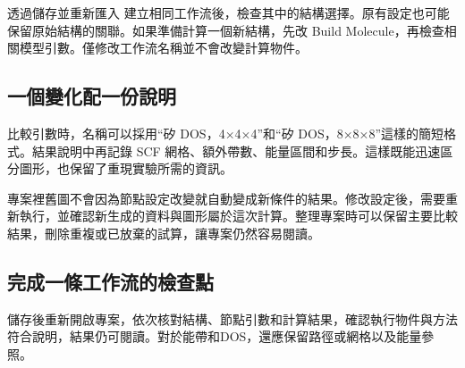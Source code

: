 透過儲存並重新匯入  建立相同工作流後，檢查其中的結構選擇。原有設定也可能保留原始結構的關聯。如果準備計算一個新結構，先改 Build Molecule，再檢查相關模型引數。僅修改工作流名稱並不會改變計算物件。

\subsection{一個變化配一份說明}

比較引數時，名稱可以採用“矽 DOS，4×4×4”和“矽 DOS，8×8×8”這樣的簡短格式。結果說明中再記錄 SCF 網格、額外帶數、能量區間和步長。這樣既能迅速區分圖形，也保留了重現實驗所需的資訊。

專案裡舊圖不會因為節點設定改變就自動變成新條件的結果。修改設定後，需要重新執行，並確認新生成的資料與圖形屬於這次計算。整理專案時可以保留主要比較結果，刪除重複或已放棄的試算，讓專案仍然容易閱讀。

\subsection{完成一條工作流的檢查點}

儲存後重新開啟專案，依次核對結構、節點引數和計算結果，確認執行物件與方法符合說明，結果仍可閱讀。對於能帶和DOS，還應保留路徑或網格以及能量參照。
